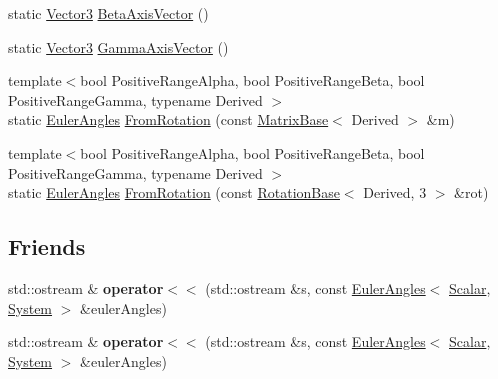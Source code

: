 \begin{DoxyCompactItemize}
\item 
static \hyperlink{class_eigen_1_1_euler_angles_af0f446aa0f46b3439abedff63fabf39c}{Vector3} \hyperlink{class_eigen_1_1_euler_angles_aede24ef1ffc5913f2eb6539c1f1b9dc4}{Beta\+Axis\+Vector} ()
\item 
static \hyperlink{class_eigen_1_1_euler_angles_af0f446aa0f46b3439abedff63fabf39c}{Vector3} \hyperlink{class_eigen_1_1_euler_angles_a77ea78dac1d599353e2a87d95cc6f1d4}{Gamma\+Axis\+Vector} ()
\item 
{\footnotesize template$<$bool Positive\+Range\+Alpha, bool Positive\+Range\+Beta, bool Positive\+Range\+Gamma, typename Derived $>$ }\\static \hyperlink{class_eigen_1_1_euler_angles}{Euler\+Angles} \hyperlink{class_eigen_1_1_euler_angles_accbaa67f736f1883641f70994ffc7284}{From\+Rotation} (const \hyperlink{group___core___module_class_eigen_1_1_matrix_base}{Matrix\+Base}$<$ Derived $>$ \&m)
\item 
{\footnotesize template$<$bool Positive\+Range\+Alpha, bool Positive\+Range\+Beta, bool Positive\+Range\+Gamma, typename Derived $>$ }\\static \hyperlink{class_eigen_1_1_euler_angles}{Euler\+Angles} \hyperlink{class_eigen_1_1_euler_angles_aec5a08ed94b3574402d99850d766d18a}{From\+Rotation} (const \hyperlink{class_eigen_1_1_rotation_base}{Rotation\+Base}$<$ Derived, 3 $>$ \&rot)
\end{DoxyCompactItemize}
\subsection*{Friends}
\begin{DoxyCompactItemize}
\item 
\mbox{\label{class_eigen_1_1_euler_angles_a649647ed389370e190cd9f2a53ed1191}} 
std\+::ostream \& {\bfseries operator$<$$<$} (std\+::ostream \&s, const \hyperlink{class_eigen_1_1_euler_angles}{Euler\+Angles}$<$ \hyperlink{class_eigen_1_1_euler_angles_a2ab1d433ac9683268446f8905ac31aac}{Scalar}, \hyperlink{class_eigen_1_1_euler_angles_a17e3dee5fef4af35bbb4e319c2cdc3c1}{System} $>$ \&euler\+Angles)
\item 
\mbox{\label{class_eigen_1_1_euler_angles_a649647ed389370e190cd9f2a53ed1191}} 
std\+::ostream \& {\bfseries operator$<$$<$} (std\+::ostream \&s, const \hyperlink{class_eigen_1_1_euler_angles}{Euler\+Angles}$<$ \hyperlink{class_eigen_1_1_euler_angles_a2ab1d433ac9683268446f8905ac31aac}{Scalar}, \hyperlink{class_eigen_1_1_euler_angles_a17e3dee5fef4af35bbb4e319c2cdc3c1}{System} $>$ \&euler\+Angles)
\end{DoxyCompactItemize}


